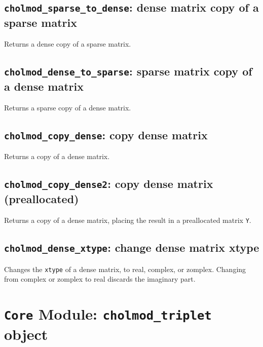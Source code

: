 \documentclass[11pt]{article}
\begin{document}
\newpage \subsection{{\tt cholmod\_sparse\_to\_dense}: dense matrix copy of a sparse matrix}


Returns a dense copy of a sparse matrix.

\subsection{{\tt cholmod\_dense\_to\_sparse}: sparse matrix copy of a dense matrix}


Returns a sparse copy of a dense matrix.

\subsection{{\tt cholmod\_copy\_dense}: copy dense matrix}


Returns a copy of a dense matrix.

\newpage \subsection{{\tt cholmod\_copy\_dense2}: copy dense matrix (preallocated)}


Returns a copy of a dense matrix, placing the result in a preallocated matrix {\tt Y}.

\subsection{{\tt cholmod\_dense\_xtype}: change dense matrix xtype}


Changes the {\tt xtype} of a dense matrix, to real, complex, or zomplex.
Changing from complex or zomplex to real discards the imaginary part.

\newpage \section{{\tt Core} Module: {\tt cholmod\_triplet} object}
\label{cholmod_triplet}
\end{document}
